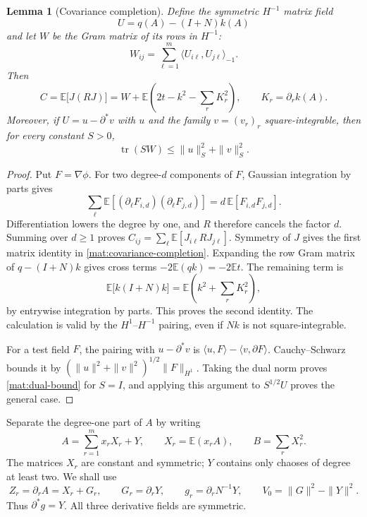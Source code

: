 \documentclass[11pt]{article}
\newcommand{\E}{\mathbb E}
\DeclareMathOperator{\tr}{tr}
\newcommand{\Id}{I}
\newtheorem{lemma}[theorem]{Lemma}
\theoremstyle{definition}
\theoremstyle{remark}
\numberwithin{equation}{section}
\begin{document}
\begin{lemma}[Covariance completion]\label{mat:covariance}
Define the symmetric $H^{-1}$ matrix field
\[
 U=q(A)-(\Id+N)k(A)
\]
and let $W$ be the Gram matrix of its rows in $H^{-1}$:
\[
 W_{ij}=\sum_{\ell=1}^m
       \langle U_{i\ell},U_{j\ell}\rangle_{-1}.
\]
Then
\begin{equation}\label{mat:covariance-completion}
 C=\E\bigl[J(RJ)\bigr]
   =W+\E\left(2t-k^2-\sum_r K_r^2\right),
 \qquad K_r=\partial_r k(A).
\end{equation}
Moreover, if $U=u-\partial^*v$ with $u$ and the family $v=(v_r)_r$
square-integrable, then for every constant $S>0$,
\begin{equation}\label{mat:dual-bound}
 \tr(SW)\le\|u\|_S^2+\|v\|_S^2.
\end{equation}
\end{lemma}

\begin{proof}
Put $F=\nabla\phi$.  For two degree-$d$ components of $F$, Gaussian
integration by parts gives
\[
 \sum_\ell\E[(\partial_\ell F_{i,d})(\partial_\ell F_{j,d})]
 =d\,\E[F_{i,d}F_{j,d}].
\]
Differentiation lowers the degree by one, and $R$ therefore cancels the
factor $d$.  Summing over $d\ge1$ proves
$C_{ij}=\sum_\ell\E[J_{i\ell}R J_{j\ell}]$.  Symmetry of $J$ gives
the first matrix identity in \eqref{mat:covariance-completion}.
Expanding the row Gram matrix of $q-(\Id+N)k$ gives cross terms
$-2\E(qk)=-2\E t$.  The remaining term is
\[
 \E\bigl[k(\Id+N)k\bigr]
   =\E\left(k^2+\sum_r K_r^2\right),
\]
by entrywise integration by parts.  This proves the second identity.
The calculation is valid by the $H^1$--$H^{-1}$ pairing, even if $Nk$
is not square-integrable.

For a test field $F$, the pairing with $u-\partial^*v$ is
$\langle u,F\rangle-\langle v,\partial F\rangle$.  Cauchy--Schwarz
bounds it by
$(\|u\|^2+\|v\|^2)^{1/2}\|F\|_{H^1}$.  Taking the dual norm proves
\eqref{mat:dual-bound} for $S=\Id$, and applying this argument to
$S^{1/2}U$ proves the general case.
\end{proof}

Separate the degree-one part of $A$ by writing
\begin{equation}\label{mat:chaos}
 A=\sum_{r=1}^m x_rX_r+Y,\qquad
 X_r=\E(x_rA),\qquad B=\sum_rX_r^2.
\end{equation}
The matrices $X_r$ are constant and symmetric; $Y$ contains only chaoses
of degree at least two.  We shall use
\begin{equation}\label{mat:gradient-fields}
 Z_r=\partial_rA=X_r+G_r,\qquad
 G_r=\partial_rY,\qquad
 g_r=\partial_rN^{-1}Y,
 \qquad V_0=\|G\|^2-\|Y\|^2.
\end{equation}
Thus $\partial^*g=Y$.  All three derivative fields are symmetric.
\end{document}
